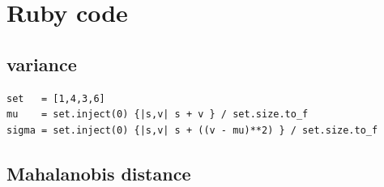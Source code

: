 \documentclass[11pt,twocolumn]{amsart} %
\begin{document}
\onecolumn

\section{Ruby code}
\subsection{variance}
\begin{verbatim}
set   = [1,4,3,6]
mu    = set.inject(0) {|s,v| s + v } / set.size.to_f
sigma = set.inject(0) {|s,v| s + ((v - mu)**2) } / set.size.to_f
\end{verbatim}

\subsection{Mahalanobis distance}
\end{document}
